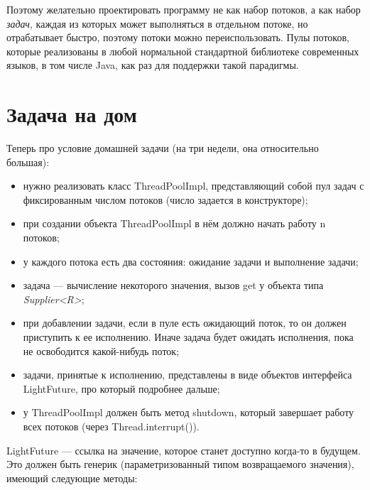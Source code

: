 \documentclass[a5paper]{article}
\begin{document}
Поэтому желательно проектировать программу не как набор потоков, а как набор \textit{задач}, каждая из которых может выполняться в отдельном потоке, но отрабатывает быстро, поэтому потоки можно переиспользовать. Пулы потоков, которые реализованы в любой нормальной стандартной библиотеке современных языков, в том числе Java, как раз для поддержки такой парадигмы.

\section{Задача на дом}

Теперь про условие домашней задачи (на три недели, она относительно большая):
\begin{itemize}
	\item нужно реализовать класс ThreadPoolImpl, представляющий собой пул задач с фиксированным числом потоков (число задается в конструкторе);
	\item при создании объекта ThreadPoolImpl в нём должно начать работу n потоков;
	\item у каждого потока есть два состояния: ожидание задачи и выполнение задачи;
	\item задача --- вычисление некоторого значения, вызов get у объекта типа \textit{Supplier<R>};
	\item при добавлении задачи, если в пуле есть ожидающий поток, то он должен приступить к ее исполнению. Иначе задача будет ожидать исполнения, пока не освободится какой-нибудь поток;
	\item задачи, принятые к исполнению, представлены в виде объектов интерфейса LightFuture, про который подробнее дальше;
	\item у ThreadPoolImpl должен быть метод shutdown, который завершает работу всех потоков (через Thread.interrupt()).
\end{itemize}

LightFuture --- ссылка на значение, которое станет доступно когда-то в будущем. Это должен быть генерик (параметризованный типом возвращаемого значения), имеющий следующие методы:
\end{document}
